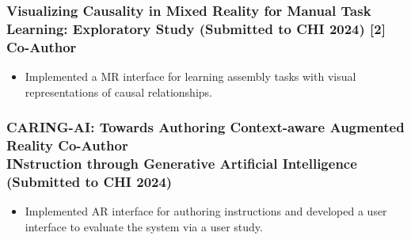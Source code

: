 \vspace{-2em}
\subsubsection*{\footnotesize Visualizing Causality in Mixed Reality for Manual Task Learning: Exploratory Study (Submitted to CHI 2024) [2] \hfill Co-Author
}
\vspace{-0.5em}
\begin{itemize}
    \setlength\itemsep{-0.5em}
    \item \small Implemented a MR interface for learning assembly tasks with visual representations of causal relationships.
\end{itemize}

\vspace{-2em}
\subsubsection*{\footnotesize CARING-AI: Towards Authoring Context-aware Augmented Reality \hfill Co-Author \\ INstruction through Generative Artificial Intelligence (Submitted to CHI 2024)}
\vspace{-0.5em}
\begin{itemize}
    \setlength\itemsep{-0.5em}
    \item \small Implemented AR interface for authoring instructions and developed a user interface to evaluate the system via a user study.
\end{itemize}


